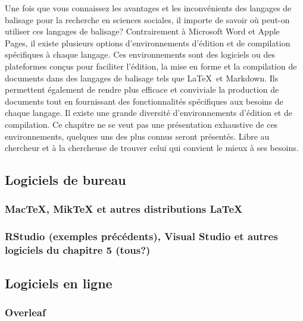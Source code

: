\documentclass[
  letterpaper,
]{scrbook}
\begin{document}
Une fois que vous connaissez les avantages et les inconvénients des
langages de balisage pour la recherche en sciences sociales, il importe
de savoir où peut-on utiliser ces langages de balisage? Contrairement à
Microsoft Word et Apple Pages, il existe plusieurs options
d'environnements d'édition et de compilation spécifiques à chaque
langage. Ces environnements sont des logiciels ou des plateformes conçus
pour faciliter l'édition, la mise en forme et la compilation de
documents dans des langages de balisage tels que \LaTeX~et Markdown. Ils
permettent également de rendre plus efficace et conviviale la production
de documents tout en fournissant des fonctionnalités spécifiques aux
besoins de chaque langage. Il existe une grande diversité
d'environnements d'édition et de compilation. Ce chapitre ne se veut pas
une présentation exhaustive de ces environnements, quelques uns des plus
connus seront présentés. Libre au chercheur et à la chercheuse de
trouver celui qui convient le mieux à ses besoins.

\hypertarget{logiciels-de-bureau}{%
\subsection{Logiciels de bureau}\label{logiciels-de-bureau}}

\hypertarget{mactex-miktex-et-autres-distributions}{%
\subsubsection{\texorpdfstring{MacTeX, MikTeX et autres distributions
\LaTeX}{MacTeX, MikTeX et autres distributions }}\label{mactex-miktex-et-autres-distributions}}

\hypertarget{rstudio-exemples-pruxe9cuxe9dents-visual-studio-et-autres-logiciels-du-chapitre-5-tous}{%
\subsubsection{RStudio (exemples précédents), Visual Studio et autres
logiciels du chapitre 5
(tous?)}\label{rstudio-exemples-pruxe9cuxe9dents-visual-studio-et-autres-logiciels-du-chapitre-5-tous}}

\hypertarget{logiciels-en-ligne}{%
\subsection{Logiciels en ligne}\label{logiciels-en-ligne}}

\hypertarget{overleaf}{%
\subsubsection{Overleaf}\label{overleaf}}
\end{document}
